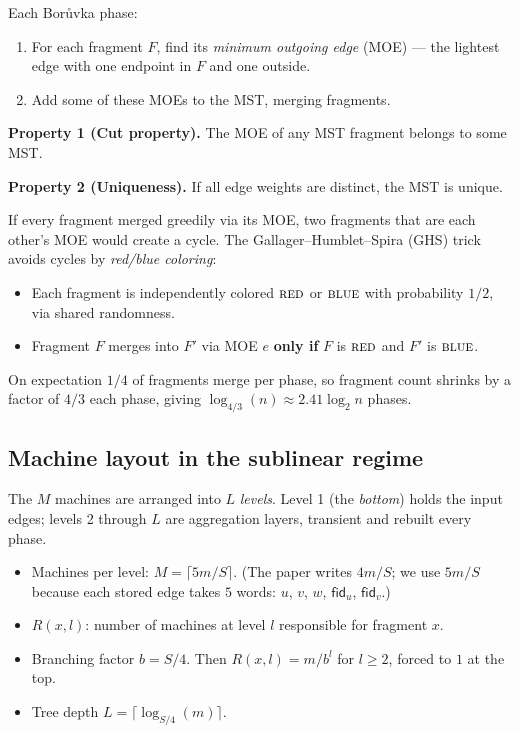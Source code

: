 \documentclass[11pt]{article}
\begin{document}
Each Bor\r{u}vka phase:
\begin{enumerate}[topsep=2pt, itemsep=2pt, leftmargin=*]
    \item For each fragment $F$, find its \textit{minimum outgoing edge}
          (MOE) --- the lightest edge with one endpoint in $F$ and one outside.
    \item Add some of these MOEs to the MST, merging fragments.
\end{enumerate}

\textbf{Property 1 (Cut property).} The MOE of any MST fragment belongs to
some MST.

\textbf{Property 2 (Uniqueness).} If all edge weights are distinct, the MST
is unique.

If every fragment merged greedily via its MOE, two fragments that are each
other's MOE would create a cycle. The Gallager--Humblet--Spira (GHS) trick
avoids cycles by \textit{red/blue coloring}:
\begin{itemize}[topsep=2pt, itemsep=2pt, leftmargin=*]
    \item Each fragment is independently colored $\textsc{red}$ or
          $\textsc{blue}$ with probability $1/2$, via shared randomness.
    \item Fragment $F$ merges into $F'$ via MOE $e$ \textbf{only if} $F$ is
          $\textsc{red}$ and $F'$ is $\textsc{blue}$.
\end{itemize}
On expectation $1/4$ of fragments merge per phase, so fragment count shrinks
by a factor of $4/3$ each phase, giving $\log_{4/3}(n) \approx 2.41 \log_2 n$
phases.

\subsection{Machine layout in the sublinear regime}

The $M$ machines are arranged into $L$ \textit{levels}. Level 1 (the
\textit{bottom}) holds the input edges; levels 2 through $L$ are aggregation
layers, transient and rebuilt every phase.

\begin{itemize}[topsep=2pt, itemsep=2pt, leftmargin=*]
    \item Machines per level: $M = \lceil 5m/S \rceil$. (The paper writes
          $4m/S$; we use $5m/S$ because each stored edge takes $5$ words:
          $u$, $v$, $w$, $\textsf{fid}_u$, $\textsf{fid}_v$.)
    \item $R(x, l)$: number of machines at level $l$ responsible for
          fragment $x$.
    \item Branching factor $b = S/4$. Then $R(x, l) = m / b^l$ for
          $l \ge 2$, forced to $1$ at the top.
    \item Tree depth $L = \lceil \log_{S/4}(m) \rceil$.
\end{itemize}
\end{document}
